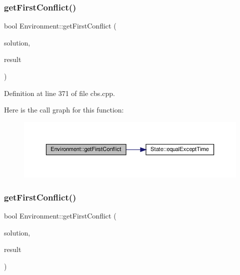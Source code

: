 \subsubsection{\texorpdfstring{get\+First\+Conflict()}{getFirstConflict()}\hspace{0.1cm}{\footnotesize\ttfamily [1/2]}}
{\footnotesize\ttfamily bool Environment\+::get\+First\+Conflict (\begin{DoxyParamCaption}\item[{const std\+::vector$<$ \hyperlink{structlib_multi_robot_planning_1_1_plan_result}{Plan\+Result}$<$ \hyperlink{struct_state}{State}, \hyperlink{a__star_8cpp_a8bb1ef53467e4f61410d12822d922498}{Action}, int $>$ $>$ \&}]{solution,  }\item[{\hyperlink{struct_conflict}{Conflict} \&}]{result }\end{DoxyParamCaption})\hspace{0.3cm}{\ttfamily [inline]}}



Definition at line 371 of file cbs.\+cpp.

Here is the call graph for this function\+:
\nopagebreak
\begin{figure}[H]
\begin{center}
\leavevmode
\includegraphics[width=350pt]{class_environment_a666d55a1f0bbc038d3662b75f400faa4_cgraph}
\end{center}
\end{figure}
\mbox{\label{class_environment_a666d55a1f0bbc038d3662b75f400faa4}} 
\subsubsection{\texorpdfstring{get\+First\+Conflict()}{getFirstConflict()}\hspace{0.1cm}{\footnotesize\ttfamily [2/2]}}
{\footnotesize\ttfamily bool Environment\+::get\+First\+Conflict (\begin{DoxyParamCaption}\item[{const std\+::vector$<$ \hyperlink{structlib_multi_robot_planning_1_1_plan_result}{Plan\+Result}$<$ \hyperlink{struct_state}{State}, \hyperlink{a__star_8cpp_a8bb1ef53467e4f61410d12822d922498}{Action}, int $>$ $>$ \&}]{solution,  }\item[{\hyperlink{struct_conflict}{Conflict} \&}]{result }\end{DoxyParamCaption})\hspace{0.3cm}{\ttfamily [inline]}}



